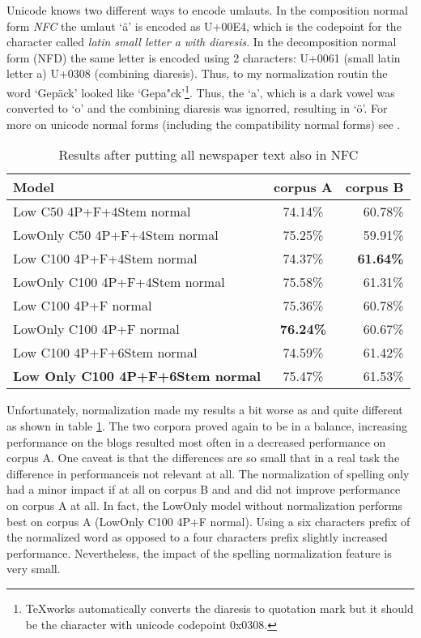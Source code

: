 \documentclass[11pt,letterpaper, covington]{article}
\begin{document}
Unicode knows two different ways to encode umlauts.  In the composition normal form \emph{NFC} the umlaut `ä' is encoded as U+00E4, which is the codepoint for the character called \emph{latin small letter a with diaresis}. In the decomposition normal form (NFD) the same letter is encoded using 2 characters: U+0061 (small latin letter a) U+0308 (combining diaresis).  Thus, to my normalization routin the word `Gepäck' looked like `Gepa"ck'\footnote{TeXworks automatically converts the diaresis to quotation mark but it should be the character with unicode codepoint 0x0308.}. Thus, the `a', which is a dark vowel was converted to `o' and the combining diaresis was ignorred, resulting in `ö'. For more on unicode normal forms (including the compatibility normal forms) see \citet{DK13}.

\begin{table}
\center
  \begin{tabular}{ | l || c | r | }
    \hline
   \textbf{Model} & \textbf{corpus A} & \textbf{corpus B}  \\ \hline
    Low C50 4P+F+4Stem normal & 74.14\% & 60.78\% \\
    LowOnly C50 4P+F+4Stem normal & 75.25\% & 59.91\% \\ 
    Low C100 4P+F+4Stem normal & 74.37\% & \textbf{61.64\%} \\
    LowOnly C100 4P+F+4Stem normal & 75.58\% & 61.31\% \\ 
    Low C100 4P+F normal & 75.36\% & 60.78\% \\
    LowOnly C100 4P+F normal & \textbf{76.24\%} & 60.67\% \\
    Low C100 4P+F+6Stem normal & 74.59\% & 61.42\% \\    
\textbf{Low Only C100 4P+F+6Stem normal} & 75.47\% & 61.53\% \\
 \hline
  \end{tabular}
\caption{Results after putting all newspaper text also in NFC}
\label{tab:fin}
\end{table}

Unfortunately, normalization made my results a bit worse as and quite different as shown in table \ref{tab:fin}. The two corpora proved again to be in a balance, increasing performance on the blogs resulted most often in a decreased performance on corpus A. One caveat is that the differences are so small that in a real task the difference in performanceis not relevant at all. The normalization of spelling only had a minor impact if at all on corpus B and and did not improve performance on corpus A at all. In fact, the LowOnly model without normalization performs best on corpus A (LowOnly  C100 4P+F normal). Using a six characters prefix of the normalized word as opposed to a four characters prefix slightly increased performance. Nevertheless, the impact of the spelling normalization feature is very small.
\end{document}
